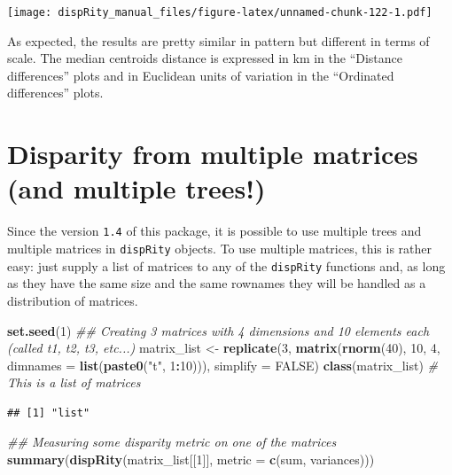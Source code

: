 \documentclass[
]{book}
\newenvironment{Shaded}{\begin{snugshade}}{\end{snugshade}}
\newcommand{\CommentTok}[1]{\textcolor[rgb]{0.56,0.35,0.01}{\textit{#1}}}
\newcommand{\DataTypeTok}[1]{\textcolor[rgb]{0.13,0.29,0.53}{#1}}
\newcommand{\DecValTok}[1]{\textcolor[rgb]{0.00,0.00,0.81}{#1}}
\newcommand{\KeywordTok}[1]{\textcolor[rgb]{0.13,0.29,0.53}{\textbf{#1}}}
\newcommand{\NormalTok}[1]{#1}
\newcommand{\OperatorTok}[1]{\textcolor[rgb]{0.81,0.36,0.00}{\textbf{#1}}}
\newcommand{\OtherTok}[1]{\textcolor[rgb]{0.56,0.35,0.01}{#1}}
\newcommand{\StringTok}[1]{\textcolor[rgb]{0.31,0.60,0.02}{#1}}
\begin{document}
\texttt{[image: dispRity\_manual\_files/figure-latex/unnamed-chunk-122-1.pdf]}

As expected, the results are pretty similar in pattern but different in terms of scale.
The median centroids distance is expressed in km in the ``Distance differences'' plots and in Euclidean units of variation in the ``Ordinated differences'' plots.

\hypertarget{multi.input}{%
\section{Disparity from multiple matrices (and multiple trees!)}\label{multi.input}}

Since the version \texttt{1.4} of this package, it is possible to use multiple trees and multiple matrices in \texttt{dispRity} objects.
To use multiple matrices, this is rather easy: just supply a list of matrices to any of the \texttt{dispRity} functions and, as long as they have the same size and the same rownames they will be handled as a distribution of matrices.

\begin{Shaded}
\begin{Highlighting}[]
\KeywordTok{set.seed}\NormalTok{(}\DecValTok{1}\NormalTok{)}
\CommentTok{\#\# Creating 3 matrices with 4 dimensions and 10 elements each (called t1, t2, t3, etc...)}
\NormalTok{matrix\_list \textless{}{-}}\StringTok{ }\KeywordTok{replicate}\NormalTok{(}\DecValTok{3}\NormalTok{, }\KeywordTok{matrix}\NormalTok{(}\KeywordTok{rnorm}\NormalTok{(}\DecValTok{40}\NormalTok{), }\DecValTok{10}\NormalTok{, }\DecValTok{4}\NormalTok{, }\DataTypeTok{dimnames =} \KeywordTok{list}\NormalTok{(}\KeywordTok{paste0}\NormalTok{(}\StringTok{"t"}\NormalTok{, }\DecValTok{1}\OperatorTok{:}\DecValTok{10}\NormalTok{))),}
                         \DataTypeTok{simplify =} \OtherTok{FALSE}\NormalTok{)}
\KeywordTok{class}\NormalTok{(matrix\_list) }\CommentTok{\# This is a list of matrices}
\end{Highlighting}
\end{Shaded}

\begin{verbatim}
## [1] "list"
\end{verbatim}

\begin{Shaded}
\begin{Highlighting}[]
\CommentTok{\#\# Measuring some disparity metric on one of the matrices}
\KeywordTok{summary}\NormalTok{(}\KeywordTok{dispRity}\NormalTok{(matrix\_list[[}\DecValTok{1}\NormalTok{]], }\DataTypeTok{metric =} \KeywordTok{c}\NormalTok{(sum, variances)))}
\end{Highlighting}
\end{Shaded}
\end{document}
